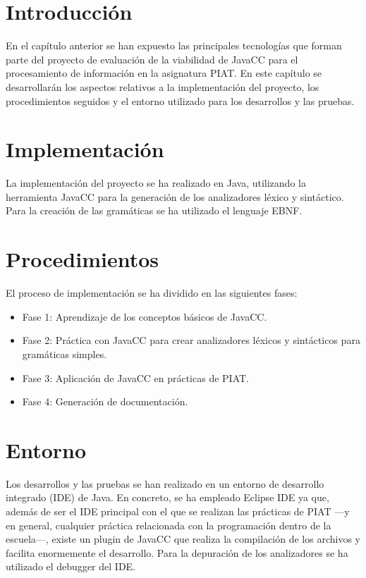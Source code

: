 \section{Introducción}
En el capítulo anterior se han expuesto las principales tecnologías que forman parte del proyecto de evaluación de la viabilidad de JavaCC para el procesamiento de información en la asignatura PIAT. En este capítulo se desarrollarán los aspectos relativos a la implementación del proyecto, los procedimientos seguidos y el entorno utilizado para los desarrollos y las pruebas.

\section{Implementación}
La implementación del proyecto se ha realizado en Java, utilizando la herramienta JavaCC para la generación de los analizadores léxico y sintáctico. Para la creación de las gramáticas se ha utilizado el lenguaje EBNF.

\section{Procedimientos}

El proceso de implementación se ha dividido en las siguientes fases:
\begin{itemize}
    \item Fase 1: Aprendizaje de los conceptos básicos de JavaCC.
    \item Fase 2: Práctica con JavaCC para crear analizadores léxicos y sintácticos para gramáticas simples.
    \item Fase 3: Aplicación de JavaCC en prácticas de PIAT.
    \item Fase 4: Generación de documentación.
\end{itemize}

\section{Entorno}
Los desarrollos y las pruebas se han realizado en un entorno de desarrollo integrado (IDE) de Java. En concreto, se ha empleado Eclipse IDE ya que, además de ser el IDE principal con el que se realizan las prácticas de PIAT ---y en general, cualquier práctica relacionada con la programación dentro de la escuela---, existe un plugin de JavaCC que realiza la compilación de los archivos y facilita enormemente el desarrollo. Para la depuración de los analizadores se ha utilizado el debugger del IDE.

